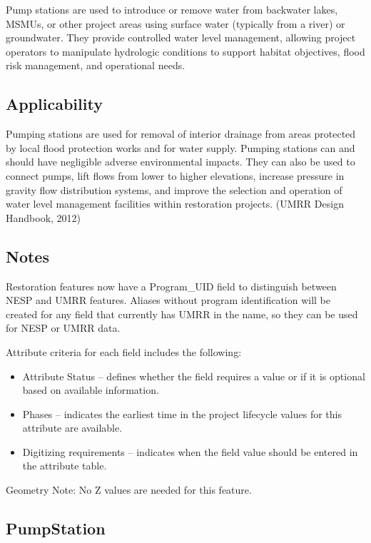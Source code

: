 \documentclass[
  letterpaper,
  DIV=11,
  numbers=noendperiod]{scrreprt}
\providecommand{\tightlist}{%
  \setlength{\itemsep}{0pt}\setlength{\parskip}{0pt}}
\begin{document}
Pump stations are used to introduce or remove water from backwater
lakes, MSMUs, or other project areas using surface water (typically from
a river) or groundwater. They provide controlled water level management,
allowing project operators to manipulate hydrologic conditions to
support habitat objectives, flood risk management, and operational
needs.

\subsection{Applicability}\label{applicability-10}

Pumping stations are used for removal of interior drainage from areas
protected by local flood protection works and for water supply. Pumping
stations can and should have negligible adverse environmental impacts.
They can also be used to connect pumps, lift flows from lower to higher
elevations, increase pressure in gravity flow distribution systems, and
improve the selection and operation of water level management facilities
within restoration projects. (UMRR Design Handbook, 2012)

\subsection{Notes}\label{notes-12}

Restoration features now have a Program\_UID field to distinguish
between NESP and UMRR features. Aliases without program identification
will be created for any field that currently has UMRR in the name, so
they can be used for NESP or UMRR data.

Attribute criteria for each field includes the following:

\begin{itemize}
\tightlist
\item
  Attribute Status -- defines whether the field requires a value or if
  it is optional based on available information.
\item
  Phases -- indicates the earliest time in the project lifecycle values
  for this attribute are available.
\item
  Digitizing requirements -- indicates when the field value should be
  entered in the attribute table.
\end{itemize}

Geometry Note: No Z values are needed for this feature.

\subsection{PumpStation}\label{pumpstation}
\end{document}
